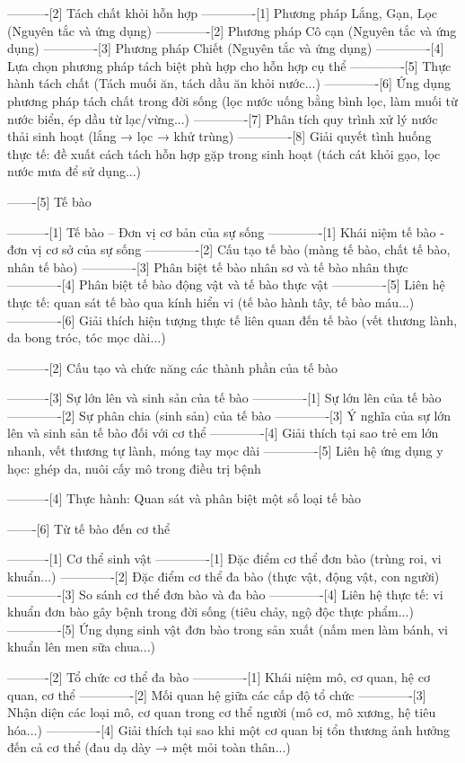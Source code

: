 ----------[2] Tách chất khỏi hỗn hợp
-------------[1] Phương pháp Lắng, Gạn, Lọc (Nguyên tắc và ứng dụng)
-------------[2] Phương pháp Cô cạn (Nguyên tắc và ứng dụng)
-------------[3] Phương pháp Chiết (Nguyên tắc và ứng dụng)
-------------[4] Lựa chọn phương pháp tách biệt phù hợp cho hỗn hợp cụ thể
-------------[5] Thực hành tách chất (Tách muối ăn, tách dầu ăn khỏi nước...)
-------------[6] Ứng dụng phương pháp tách chất trong đời sống (lọc nước uống bằng bình lọc, làm muối từ nước biển, ép dầu từ lạc/vừng...)
-------------[7] Phân tích quy trình xử lý nước thải sinh hoạt (lắng → lọc → khử trùng)
-------------[8] Giải quyết tình huống thực tế: đề xuất cách tách hỗn hợp gặp trong sinh hoạt (tách cát khỏi gạo, lọc nước mưa để sử dụng...)

-------[5] Tế bào

----------[1] Tế bào – Đơn vị cơ bản của sự sống
-------------[1] Khái niệm tế bào - đơn vị cơ sở của sự sống
-------------[2] Cấu tạo tế bào (màng tế bào, chất tế bào, nhân tế bào)
-------------[3] Phân biệt tế bào nhân sơ và tế bào nhân thực
-------------[4] Phân biệt tế bào động vật và tế bào thực vật
-------------[5] Liên hệ thực tế: quan sát tế bào qua kính hiển vi (tế bào hành tây, tế bào máu...)
-------------[6] Giải thích hiện tượng thực tế liên quan đến tế bào (vết thương lành, da bong tróc, tóc mọc dài...)

----------[2] Cấu tạo và chức năng các thành phần của tế bào

----------[3] Sự lớn lên và sinh sản của tế bào
-------------[1] Sự lớn lên của tế bào
-------------[2] Sự phân chia (sinh sản) của tế bào
-------------[3] Ý nghĩa của sự lớn lên và sinh sản tế bào đối với cơ thể
-------------[4] Giải thích tại sao trẻ em lớn nhanh, vết thương tự lành, móng tay mọc dài
-------------[5] Liên hệ ứng dụng y học: ghép da, nuôi cấy mô trong điều trị bệnh

----------[4] Thực hành: Quan sát và phân biệt một số loại tế bào

-------[6] Từ tế bào đến cơ thể

----------[1] Cơ thể sinh vật
-------------[1] Đặc điểm cơ thể đơn bào (trùng roi, vi khuẩn...)
-------------[2] Đặc điểm cơ thể đa bào (thực vật, động vật, con người)
-------------[3] So sánh cơ thể đơn bào và đa bào
-------------[4] Liên hệ thực tế: vi khuẩn đơn bào gây bệnh trong đời sống (tiêu chảy, ngộ độc thực phẩm...)
-------------[5] Ứng dụng sinh vật đơn bào trong sản xuất (nấm men làm bánh, vi khuẩn lên men sữa chua...)

----------[2] Tổ chức cơ thể đa bào
-------------[1] Khái niệm mô, cơ quan, hệ cơ quan, cơ thể
-------------[2] Mối quan hệ giữa các cấp độ tổ chức
-------------[3] Nhận diện các loại mô, cơ quan trong cơ thể người (mô cơ, mô xương, hệ tiêu hóa...)
-------------[4] Giải thích tại sao khi một cơ quan bị tổn thương ảnh hưởng đến cả cơ thể (đau dạ dày → mệt mỏi toàn thân...)

